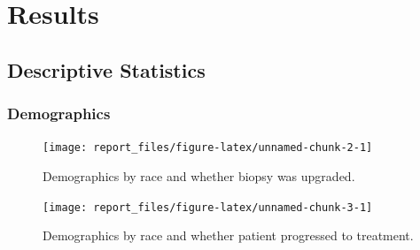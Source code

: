 \documentclass[]{article}
\begin{document}
\hypertarget{results}{%
\section{Results}\label{results}}

\hypertarget{descriptive-statistics}{%
\subsection{Descriptive Statistics}\label{descriptive-statistics}}

\hypertarget{demographics}{%
\subsubsection{Demographics}\label{demographics}}

\begin{figure}

{\centering \texttt{[image: report\_files/figure-latex/unnamed-chunk-2-1]} 

}

\caption{Demographics by race and whether biopsy was upgraded.}\label{fig:unnamed-chunk-2}
\end{figure}

\begin{figure}

{\centering \texttt{[image: report\_files/figure-latex/unnamed-chunk-3-1]} 

}

\caption{Demographics by race and whether patient progressed to treatment.}\label{fig:unnamed-chunk-3}
\end{figure}
\end{document}
